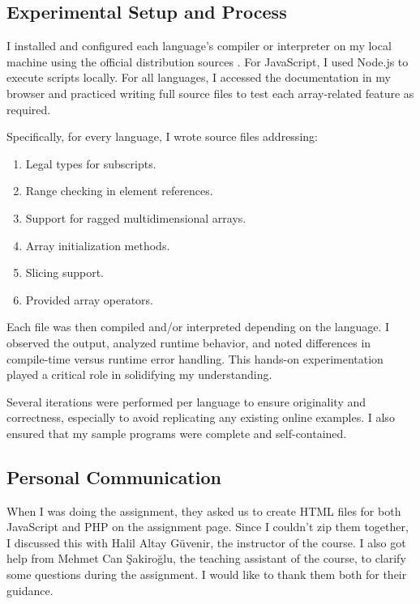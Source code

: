 \documentclass{article}
\begin{document}
\subsection{Experimental Setup and Process}

I installed and configured each language's compiler or interpreter on my local machine using the official distribution sources \cite{dartcomp, gocomp, jscomp, kotlinc, phpcomp, pycomp, rustcomp}. For JavaScript, I used Node.js to execute scripts locally. For all languages, I accessed the documentation in my browser and practiced writing full source files to test each array-related feature as required.

Specifically, for every language, I wrote source files addressing:
\begin{enumerate}
    \item Legal types for subscripts.
    \item Range checking in element references.
    \item Support for ragged multidimensional arrays.
    \item Array initialization methods.
    \item Slicing support.
    \item Provided array operators.
\end{enumerate}

Each file was then compiled and/or interpreted depending on the language. I observed the output, analyzed runtime behavior, and noted differences in compile-time versus runtime error handling. This hands-on experimentation played a critical role in solidifying my understanding.

Several iterations were performed per language to ensure originality and correctness, especially to avoid replicating any existing online examples. I also ensured that my sample programs were complete and self-contained.

\subsection{Personal Communication}
When I was doing the assignment, they asked us to create HTML files for both JavaScript and PHP on the assignment page. Since I couldn't zip them together, I discussed this with Halil Altay Güvenir, the instructor of the course. I also got help from Mehmet Can Şakiroğlu, the teaching assistant of the course, to clarify some questions during the assignment. I would like to thank them both for their guidance.



\newpage


\end{document}
